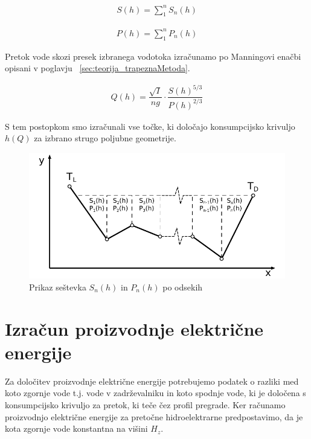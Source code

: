 \begin{ceqn}
	\begin{align}
	S(h) = \sum_{1}^{n} S_n(h)
	\end{align}
\end{ceqn}


\begin{ceqn}
	\begin{align}
	P(h) = \sum_{1}^{n} P_n(h)
	\end{align}
\end{ceqn}






Pretok vode skozi presek izbranega vodotoka izračunamo po Manningovi enačbi opisani v poglavju ~\ref{sec:teorija_trapeznaMetoda}. 

\begin{ceqn}
	\begin{align}
	Q(h) = \dfrac{\sqrt{I}}{ng} \cdot \dfrac{S(h)^{5/3}}{P(h)^{2/3}}
	\end{align}
\end{ceqn}


S tem postopkom smo izračunali vse točke, ki določajo konsumpcijsko krivuljo $h(Q)$ za izbrano strugo poljubne geometrije.


\begin{figure}[ht!]
	\begin{centering}
		\includegraphics{slike/customChannel/sestevekPretokov.pdf}
		\caption{Prikaz seštevka $S_n(h)$ in $P_n(h)$ po odsekih}\label{fig:customChannel_sestevek}
	\end{centering}
\end{figure}

\newpage

\section{Izračun proizvodnje električne energije}
Za določitev proizvodnje električne energije potrebujemo podatek o razliki med koto zgornje vode t.j. vode v zadrževalniku in koto spodnje vode, ki je določena s konsumpcijsko krivuljo za pretok, ki teče čez profil pregrade. Ker računamo proizvodnjo električne energije za pretočne hidroelektrarne predpostavimo, da je kota zgornje vode konstantna na višini $H_z$.

